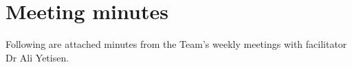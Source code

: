\section{Meeting minutes}

Following are attached minutes from the Team's weekly meetings with facilitator Dr Ali Yetisen.

\nopagecolor

% 
% 
% 
% 
% 
